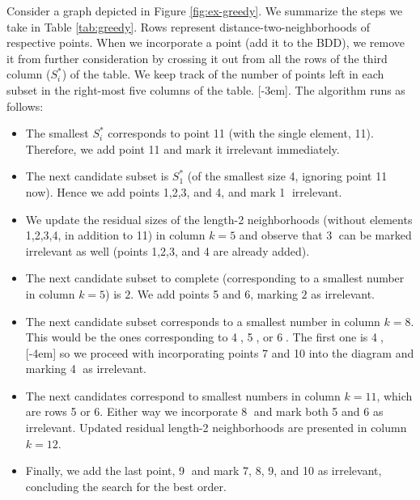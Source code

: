 \documentclass[11pt]{article}
\begin{document}
\begin{example}\label{ex:greedy}
Consider a graph depicted in Figure \ref{fig:ex-greedy}. We summarize the steps we
take in Table \ref{tab:greedy}. Rows represent distance-two-neighborhoods of
respective points. When we incorporate a point (add it to the BDD), we remove it
from further consideration by crossing it out from all the rows of the third
column (\(S^*_i\)) of the table. We keep track of the number of points left in
each subset in the right-most five columns of the table. [-3em]. The algorithm runs as follows:
\begin{itemize}
\item The smallest \(S^*_i\) corresponds to point 11 (with the single element, 11).
Therefore, we add point 11 and mark it irrelevant immediately.
\item The next candidate subset is \(S^*_1\) (of the smallest size 4, ignoring point
11 now). Hence we add points 1,2,3, and 4, and mark \textcircled{1} irrelevant.
\item We update the residual sizes of the length-2 neighborhoods (without elements
1,2,3,4, in addition to 11) in column \(k=5\) and observe that \textcircled{3}
can be marked irrelevant as well (points 1,2,3, and 4 are already added).
\item The next candidate subset to complete (corresponding to a smallest number in column
\(k=5\)) is \textcircled{$2$}. We add points 5 and 6, marking
\textcircled{$2$} as irrelevant.
\item The next candidate subset corresponds to a smallest number in column \(k=8\).
This would be the ones corresponding to \textcircled{4}, \textcircled{5}, or
\textcircled{6}. The first one is \textcircled{4}, [-4em] so we proceed with incorporating
points 7 and 10 into the diagram and marking \textcircled{4} as irrelevant.
\item The next candidates correspond to smallest numbers in column \(k=11\), which are
rows 5 or 6. Either way we incorporate \textcircled{8} and mark both 5 and 6 as
irrelevant. Updated residual length-2 neighborhoods are presented in column
\(k=12\).
\item Finally, we add the last point, \textcircled{9} and mark 7, 8, 9, and 10 as
irrelevant, concluding the search for the best order.
\end{itemize}


\end{example}
\end{document}

